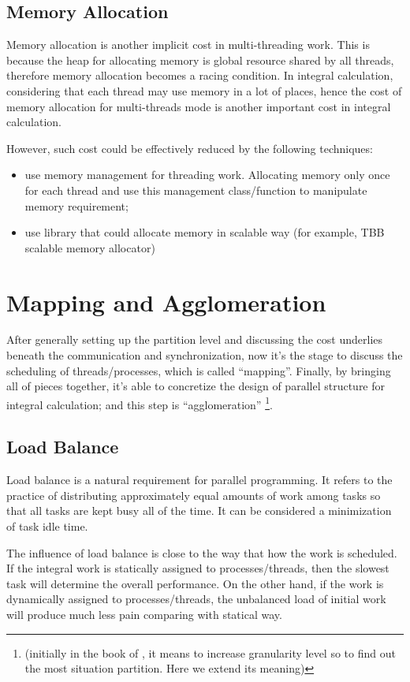 \subsection{Memory Allocation}
%
%
%
\label{mem_allocation_parallel_int}
Memory allocation is another implicit cost in multi-threading work. This is because the heap
for allocating memory is global resource shared by all threads, therefore memory allocation
becomes a racing condition. In integral calculation, considering that each thread may use
memory in a lot of places, hence the cost of memory allocation for multi-threads mode is 
another important cost in integral calculation.

However, such cost could be effectively reduced by the following techniques:
\begin{itemize}
 \item use memory management for threading work. Allocating memory only once for 
 each thread and use this management class/function to manipulate memory requirement;
 \item use library that could allocate memory in scalable way (for example, TBB scalable 
 memory allocator)
\end{itemize} 

\section{Mapping and Agglomeration }
%
%
%
After generally setting up the partition level and discussing the cost underlies beneath 
the communication and synchronization, now it's the stage to discuss the scheduling 
of threads/processes, which is called ``mapping''. Finally, by bringing all of pieces 
together, it's able to concretize the design of parallel structure for integral calculation;
and this step is ``agglomeration'' \footnote{(initially in the book of 
\cite{foster1995designingparallel}, it means to increase granularity level so to find out 
the most situation partition. Here we extend its meaning)}.

\subsection{Load Balance}
%
%
%
Load balance is a natural requirement for parallel programming. It refers to the practice 
of distributing approximately equal amounts of work among tasks so that all tasks are 
kept busy all of the time. It can be considered a minimization of task idle time.

The influence of load balance is close to the way that how the work is scheduled. If 
the integral work is statically assigned to processes/threads, then the slowest task will 
determine the overall performance. On the other hand, if the work is dynamically assigned
to processes/threads, the unbalanced load of initial work will produce much less pain comparing
with statical way.

